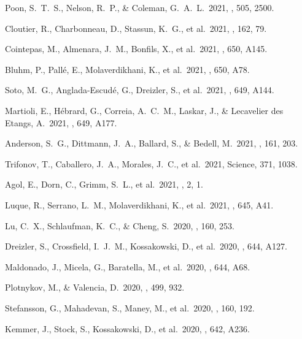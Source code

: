  Poon, S.~T.~S., Nelson, R.~P., \& Coleman, G.~A.~L.\ 2021, \mnras, 505, 2500.

 Cloutier, R., Charbonneau, D., Stassun, K.~G., et al.\ 2021, \aj, 162, 79.

 Cointepas, M., Almenara, J.~M., Bonfils, X., et al.\ 2021, \aap, 650, A145.

 Bluhm, P., Pall{\'e}, E., Molaverdikhani, K., et al.\ 2021, \aap, 650, A78.

 Soto, M.~G., Anglada-Escud{\'e}, G., Dreizler, S., et al.\ 2021, \aap, 649, A144.

 Martioli, E., H{\'e}brard, G., Correia, A.~C.~M., Laskar, J., \& Lecavelier des Etangs, A.\ 2021, \aap, 649, A177.

 Anderson, S.~G., Dittmann, J.~A., Ballard, S., \& Bedell, M.\ 2021, \aj, 161, 203.

 Trifonov, T., Caballero, J.~A., Morales, J.~C., et al.\ 2021, Science, 371, 1038.

 Agol, E., Dorn, C., Grimm, S.~L., et al.\ 2021, \psj, 2, 1.

 Luque, R., Serrano, L.~M., Molaverdikhani, K., et al.\ 2021, \aap, 645, A41.

 Lu, C.~X., Schlaufman, K.~C., \& Cheng, S.\ 2020, \aj, 160, 253.

 Dreizler, S., Crossfield, I.~J.~M., Kossakowski, D., et al.\ 2020, \aap, 644, A127.

 Maldonado, J., Micela, G., Baratella, M., et al.\ 2020, \aap, 644, A68.

 Plotnykov, M., \& Valencia, D.\ 2020, \mnras, 499, 932.

 Stefansson, G., Mahadevan, S., Maney, M., et al.\ 2020, \aj, 160, 192.

 Kemmer, J., Stock, S., Kossakowski, D., et al.\ 2020, \aap, 642, A236.

